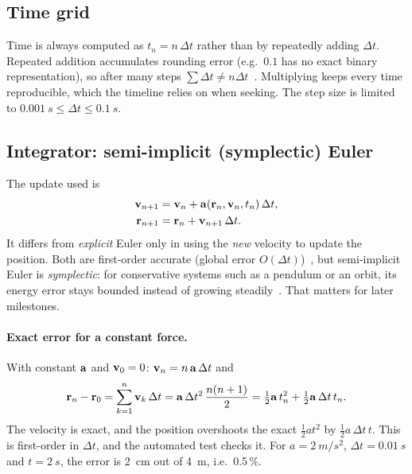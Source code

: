 \documentclass[11pt]{article}
\begin{document}
\subsection{Time grid}
Time is always computed as $t_n = n\,\Delta t$ rather than by repeatedly adding $\Delta t$.
Repeated addition accumulates rounding error (e.g.\ $0.1$ has no exact binary representation),
so after many steps $\sum \Delta t \ne n\Delta t$~\cite{goldberg1991}. Multiplying keeps every
time reproducible, which the timeline relies on when seeking. The step size is limited to
$\SI{0.001}{s}\le\Delta t\le\SI{0.1}{s}$.

\subsection{Integrator: semi-implicit (symplectic) Euler}
The update used is~\cite{hairer2006}
\begin{align}
  \mathbf{v}_{n+1} &= \mathbf{v}_n + \mathbf{a}(\mathbf{r}_n,\mathbf{v}_n,t_n)\,\Delta t, \\
  \mathbf{r}_{n+1} &= \mathbf{r}_n + \mathbf{v}_{n+1}\,\Delta t.
\end{align}
It differs from \emph{explicit} Euler only in using the \emph{new} velocity to update the position.
Both are first-order accurate (global error $O(\Delta t)$)~\cite{press2007}, but semi-implicit Euler is
\emph{symplectic}: for conservative systems such as a pendulum or an orbit, its energy error
stays bounded instead of growing steadily~\cite{hairer2006}. That matters for later milestones.

\paragraph{Exact error for a constant force.} With constant $\mathbf{a}$ and $\mathbf{v}_0 = 0$:
$\mathbf{v}_n = n\,\mathbf{a}\,\Delta t$ and
\begin{equation}
  \mathbf{r}_n - \mathbf{r}_0 = \sum_{k=1}^{n} \mathbf{v}_k\,\Delta t = \mathbf{a}\,\Delta t^2\,\frac{n(n+1)}{2}
  = \tfrac12\mathbf{a}\,t_n^2 + \tfrac12\mathbf{a}\,\Delta t\, t_n .
\end{equation}
The velocity is exact, and the position overshoots the exact $\tfrac12 a t^2$ by
$\tfrac12 a\,\Delta t\,t$. This is first-order in $\Delta t$, and the automated test checks it.
For $a = \SI{2}{m/s^2}$, $\Delta t = \SI{0.01}{s}$ and $t = \SI{2}{s}$, the error is \SI{2}{cm}
out of \SI{4}{m}, i.e.\ 0.5\,\%.
\end{document}
